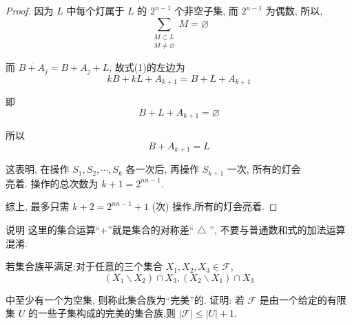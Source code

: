 \begin{proof}
	因为 $L$ 中每个灯属于 $L$ 的 $2^{n-1}$ 个非空子集, 而 $2^{n-1}$ 为偶数, 所以,
	$$
		\sum_{\substack{M \subset L \\ M \neq \varnothing}} M=\varnothing
	$$

	而 $\overline{B+A_{j}}=B+A_{j}+L$, 故式(1)的左边为
	$$
		k B+k L+A_{k+1}=B+L+A_{k+1}
	$$

	即
	$$
		B+L+A_{k+1}=\varnothing
	$$

	所以
	$$
		B+A_{k+1}=L
	$$

	这表明, 在操作 $S_{1}, S_{2}, \cdots, S_{k}$ 各一次后, 再操作 $S_{k+1}$ 一次, 所有的灯会\\
	亮着. 操作的总次数为 $k+1=2^{n n-1}$.

	综上, 最多只需 $k+2=2^{n n-1}+1$ (次) 操作,所有的灯会亮着.
\end{proof}

\begin{note}
	说明 这里的集合运算“+”就是集合的对称差“ $\triangle$ ”, 不要与普通数和式的加法运算混淆.
\end{note}

\begin{example}
	若集合族平满足:对于任意的三个集合 $X_{1}, X_{2}, X_{3} \in \mathscr{F}$,
	$$
		\left(X_{1} \backslash X_{2}\right) \cap X_{3},\left(X_{2} \backslash X_{1}\right) \cap X_{3}
	$$

	中至少有一个为空集, 则称此集合族为“完美”的. 证明: 若 $\mathscr{F}$ 是由一个给定的有限集 $U$ 的一些子集构成的完美的集合族,则 $|\mathscr{F}| \leqslant|U|+1$.
\end{example}

